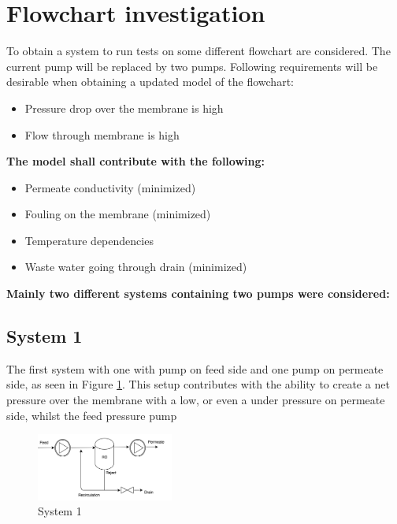 
\section{Flowchart investigation}
\label{Flowchart}
To obtain a system to run tests on some different flowchart are considered. The current pump will be replaced by two pumps. Following requirements will be desirable when obtaining a updated model of the flowchart:

\begin{itemize}
\renewcommand\labelitemi{ }
\item Pressure drop over the membrane is high
\item Flow through membrane is high
\end{itemize}
\textbf{The model shall contribute with the following:}
\begin{itemize}
\renewcommand\labelitemi{ }
\item Permeate conductivity (minimized)
\item Fouling on the membrane (minimized)
\item Temperature dependencies 
\item Waste water going through drain (minimized)
\end{itemize}

\textbf{Mainly two different systems containing two pumps were considered:}

\subsection{System 1}
The first system with one with pump on feed side and one pump on permeate side, as seen in Figure \ref{fig:FlowCInves1}. This setup contributes with the ability to create a net pressure over the membrane with a low, or even a under pressure on permeate side, whilst the feed pressure pump

\begin{figure}[h]
    \centering
    \includegraphics[width=0.4\textwidth]{FlowCInves1}
    \caption{System 1}
    \label{fig:FlowCInves1}
\end{figure}

